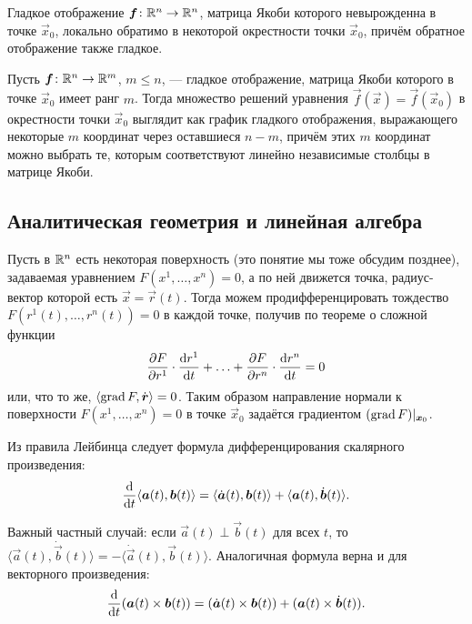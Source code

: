 \begin{theorem}
	Гладкое отображение $\boldsymbol{f}\colon \mathbb{R}^n \to \mathbb{R}^n$, матрица Якоби которого невырожденна в точке $\vec{x}_0$, локально обратимо в некоторой окрестности точки $\vec{x}_0$, причём обратное отображение также гладкое.
\end{theorem}

\begin{theorem}
	Пусть $\boldsymbol{f}\colon \mathbb{R}^n \to \mathbb{R}^m$, $m \leqslant n$, --- гладкое отображение, матрица Якоби которого в точке $\vec{x}_0$ имеет ранг $m$. Тогда множество решений уравнения $\vec{f}(\vec{x}) = \vec{f}(\vec{x}_0)$ в окрестности точки $\vec{x}_0$ выглядит как график гладкого отображения, выражающего некоторые $m$ координат через оставшиеся $n - m$, причём этих $m$ координат можно выбрать те, которым соответствуют линейно независимые столбцы в матрице Якоби.
\end{theorem}

\subsection{Аналитическая геометрия и линейная алгебра}

Пусть в $\mathbb{R}^n$ есть некоторая поверхность (это понятие мы тоже обсудим позднее), задаваемая уравнением $F(x^1, \ldots, x^n) = 0$, а по ней движется точка, радиус-вектор которой есть $\vec{x} = \vec{r}(t)$. Тогда можем продифференцировать тождество $F(r^1(t), \ldots, r^n(t)) = 0$ в каждой точке, получив по теореме о сложной функции
\[
	\frac{\partial F}{\partial r^1} \cdot \frac{\mathop{}\!\mathrm{d} r^1}{\mathop{}\!\mathrm{d} t} + \ldots + \frac{\partial F}{\partial r^n} \cdot \frac{\mathop{}\!\mathrm{d} r^n}{\mathop{}\!\mathrm{d} t} = 0
\]
или, что то же, $\langle \operatorname{grad} F, \dot{\boldsymbol{r}} \rangle = 0$. Таким образом направление нормали к поверхности $F(x^1, \ldots, x^n) = 0$ в точке $\vec{x}_0$ задаётся градиентом $(\operatorname{grad} F)|_{\boldsymbol{x}_0}$.

Из правила Лейбинца следует формула дифференцирования скалярного произведения:
\[
	\frac{\mathop{}\!\mathrm{d}}{\mathop{}\!\mathrm{d} t}\langle \boldsymbol{a}(t), \boldsymbol{b}(t) \rangle = \langle \dot{\boldsymbol{a}}(t), \boldsymbol{b}(t) \rangle + \langle \boldsymbol{a}(t), \dot{\boldsymbol{b}}(t) \rangle.
\]

Важный частный случай: если $\vec{a}(t) \perp \vec{b}(t)$ для всех $t$, то $\langle\vec{a}(t), \dot{\vec{b}}(t)\rangle = -\langle\dot{\vec{a}}(t), \vec{b}(t)\rangle$. Аналогичная формула верна и для векторного произведения:
\[
	\frac{\mathop{}\!\mathrm{d}}{\mathop{}\!\mathrm{d} t}(\boldsymbol{a}(t) \times \boldsymbol{b}(t)) = (\dot{\boldsymbol{a}}(t) \times \boldsymbol{b}(t)) + (\boldsymbol{a}(t) \times \dot{\boldsymbol{b}}(t)).
\]

